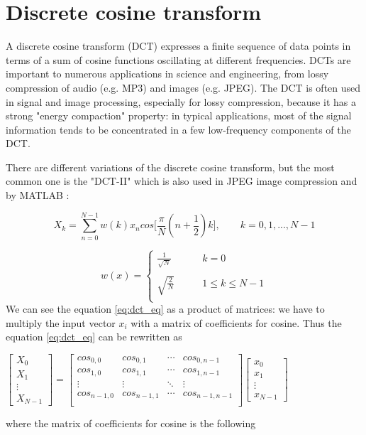 \chapter{Discrete cosine transform} \label{DCT}
A discrete cosine transform (DCT) expresses a finite sequence of data points in terms of a sum of cosine functions oscillating at different frequencies. DCTs are important to numerous applications in science and engineering, from lossy compression of audio (e.g. MP3) and images (e.g. JPEG). 
The DCT is often used in signal and image processing, especially for lossy compression, because it has a strong "energy compaction" property: in typical applications, most of the signal information tends to be concentrated in a few low-frequency components of the DCT. \cite{dct0}

There are different variations of the discrete cosine transform, but the most common one is the "DCT-II" which is also used in JPEG image compression and by MATLAB \circledR:



  \begin{equation} \label{eq:dct_eq}	
   X_{k}= \sum_{n=0}^{N-1} w(k)x_{n}cos\bigg[\frac{\pi}{N} (n+\frac{1}{2})k\bigg], \qquad k=0,1,...,N-1
 \end{equation}
 

    \[
    w(x)=\left\{
    \begin{array}{ll}
    \frac{1}{\sqrt{N}} & \qquad k=0\\
    &\\
    \sqrt{\frac{2}{N}} & \qquad 1\leqslant k \leqslant N-1\\
    \end{array}
    \right.
    \]
\bigskip
We can see the equation \ref{eq:dct_eq} as a product of matrices: we have to multiply the input vector $ x_{i} $  with a matrix of coefficients for cosine.
Thus the equation \ref{eq:dct_eq} can be rewritten as 

\begin{center}
\bigskip	
$\begin{bmatrix}X_{0}\\ X_{1} \\ \vdots \\X_{N-1} \end{bmatrix} = 
\begin{bmatrix}
	cos_{0,0} & cos_{0,1} & \cdots & cos_{0,n-1} \\
	cos_{1,0} & cos_{1,1} & \cdots & cos_{1,n-1} \\
	\vdots  & \vdots  & \ddots & \vdots  \\
	cos_{n-1,0} & cos_{n-1,1} & \cdots & cos_{n-1,n-1}  \\
\end{bmatrix} \begin{bmatrix}x_{0}\\ x_{1} \\ \vdots \\x_{N-1} \end{bmatrix}$

\end{center}
\bigskip
where the matrix of coefficients for cosine is the following

